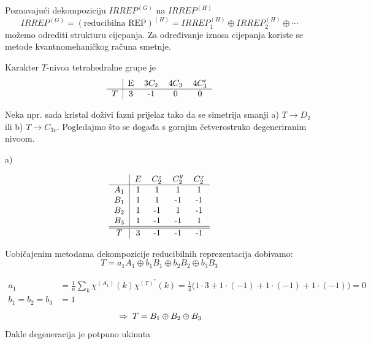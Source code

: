 Poznavajući dekompoziciju $IRREP^{(G)}$ na $IRREP^{(H)}$
\begin{displaymath}
   IRREP^{(G)}=(\text{reducibilna REP})^{(H)}=
 IRREP^{(H)}_1 \oplus IRREP^{(H)}_2 \oplus \cdots
\end{displaymath}
možemo odrediti strukturu cijepanja. Za određivanje iznosa cijepanja
koriste se metode kvantnomehaničkog računa smetnje.

\begin{primjer}

Karakter $T$-nivoa tetrahedralne grupe je
\begin{displaymath}
\begin{tabular}{c|cccc}
  & E & 3$C_2$  & 4$C_3$ & 4$C_{3}'$ \\ \hline
 $T$ & 3  & -1 & 0 & 0 
\end{tabular}
\end{displaymath}

Neka npr. sada kristal doživi fazni prijelaz tako da se
simetrija smanji a) $T\to D_2$ ili b) $T\to C_{3v}$. Pogledajmo
što se događa s gornjim četverostruko degeneriranim nivoom.

a)

\begin{displaymath}
\begin{tabular}{c|cccc}
 & $E$  & $C_{2}^z$ &  $C_{2}^y$ & $C_{2}^x$ \\ \hline
$A_1$ & 1 & 1& 1 & 1 \\
$B_1$ & 1 & 1&-1  & -1\\
$B_2$ & 1 & -1&1  & -1\\
$B_3$ & 1 & -1&-1  & 1\\ \hline \hline
 $T$ & 3 & -1 & -1 & -1
\end{tabular}
\end{displaymath}

Uobičajenim metodama dekompozicije reducibilnih reprezentacija
dobivamo:
\begin{displaymath}
   T = a_1 A_1 \oplus b_1 B_1 \oplus b_2 B_2 \oplus b_3 B_3
\end{displaymath}

\begin{align*}
a_1 &= \frac{1}{n}\sum_k \chi^{(A_1)}(k) \chi^{(T)^*}(k) =
 \frac{1}{4}\big(1\cdot3 + 1\cdot(-1) + 1\cdot(-1) + 1\cdot(-1)\big) = 0 \\
b_1 =b_2 = b_3 &= 1
\end{align*}
\begin{displaymath}
  \;\Rightarrow\;   T =  B_1 \oplus B_2 \oplus B_3
\end{displaymath}
Dakle degeneracija je potpuno ukinuta


\end{primjer}
